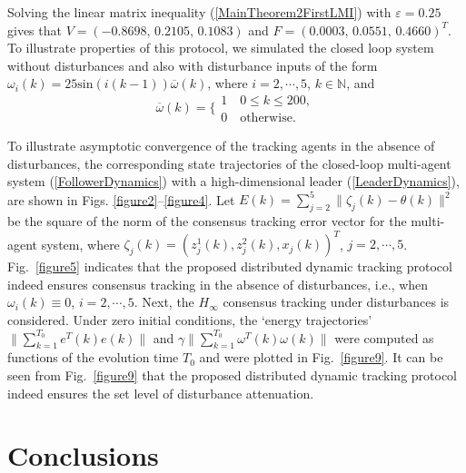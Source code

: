 \documentclass[a4paper,10pt,onecolumn]{article}
\begin{document}
Solving the linear matrix inequality (\ref{MainTheorem2FirstLMI}) with
$\varepsilon=0.25$ gives that
$V=(
   -0.8698,\,
    0.2105,\,
    0.1083)$ and
$F=(    0.0003,\,
    0.0551,\,
    0.4660)^{T}$. To illustrate properties of this
protocol, we simulated the closed loop system without disturbances and also
with disturbance inputs of the form
 $\omega_{i}(k)=25\mathrm{sin}(i(k-1))\overline{\omega}(k)$, where
 $i=2,\cdots,5$, $k\in \mathbb{N}$, and
 \begin{equation}\label{DisturbanceInSimulation}
 \overline{\omega}(k)=\bigg\{\!\!\begin{array}{c}
1 \quad 0\leq k \leq 200,\\
0 \quad \mathrm{otherwise}.
\end{array}
 \end{equation}

To illustrate asymptotic convergence of the tracking agents in the absence
of disturbances, the corresponding state trajectories of the closed-loop
multi-agent system
(\ref{FollowerDynamics}) with a high-dimensional leader
(\ref{LeaderDynamics}), are shown in Figs. \ref{figure2}--\ref{figure4}.
Let $E(k)=\sum_{j=2}^{5}\|\zeta_{j}(k)-\theta(k)\|^2$ be the
square of the norm of the consensus tracking error vector for the multi-agent system, where
$\zeta_{j}(k)=(z_{j}^{1}(k),z_{j}^{2}(k),x_{j}(k))^{T}$,
$j=2,\cdots,5$. Fig.~\ref{figure5} indicates that the proposed
distributed dynamic tracking protocol indeed ensures
consensus tracking in the absence of disturbances, i.e., when
$\omega_{i}(k)\equiv 0$,  $i=2,\cdots,5$. Next, the $H_{\infty}$ consensus
tracking under disturbances is considered. Under zero initial
conditions, the `energy trajectories' $\|\sum_{k=1}^{T_{0}}e^{T}(k)e(k)\|$ and
$\gamma\|\sum_{k=1}^{T_{0}}\omega^{T}(k)\omega(k)\|$ were computed  as
functions of the evolution time $T_{0}$  and were
plotted in Fig.~\ref{figure9}. It can be seen from Fig.~\ref{figure9} that the
proposed distributed dynamic tracking protocol indeed ensures the set level of
disturbance attenuation.









\section{Conclusions}
\end{document}
